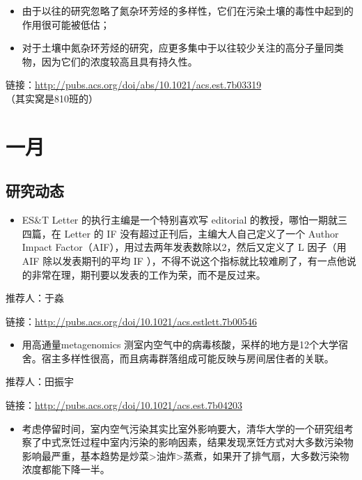 \documentclass[
]{book}
\providecommand{\tightlist}{%
  \setlength{\itemsep}{0pt}\setlength{\parskip}{0pt}}
\begin{document}
\begin{itemize}
\item
  由于以往的研究忽略了氮杂环芳烃的多样性，它们在污染土壤的毒性中起到的作用很可能被低估；
\item
  对于土壤中氮杂环芳烃的研究，应更多集中于以往较少关注的高分子量同类物，因为它们的浓度较高且具有持久性。
\end{itemize}

链接：\url{http://pubs.acs.org/doi/abs/10.1021/acs.est.7b03319}
（其实窝是810班的）

\hypertarget{ux4e00ux6708}{%
\section*{一月}\label{ux4e00ux6708}}

\hypertarget{ux7814ux7a76ux52a8ux6001-2}{%
\subsection*{研究动态}\label{ux7814ux7a76ux52a8ux6001-2}}

\begin{itemize}
\tightlist
\item
  ES\&T Letter 的执行主编是一个特别喜欢写 editorial 的教授，哪怕一期就三四篇，在 Letter 的 IF 没有超过正刊后，主编大人自己定义了一个 Author Impact Factor（AIF），用过去两年发表数除以2，然后又定义了 L 因子（用 AIF 除以发表期刊的平均 IF ），不得不说这个指标就比较难刷了，有一点他说的非常在理，期刊要以发表的工作为荣，而不是反过来。
\end{itemize}

推荐人：于淼

链接：\url{http://pubs.acs.org/doi/10.1021/acs.estlett.7b00546}

\begin{itemize}
\tightlist
\item
  用高通量metagenomics 测室内空气中的病毒核酸，采样的地方是12个大学宿舍。宿主多样性很高，而且病毒群落组成可能反映与房间居住者的关联。
\end{itemize}

推荐人：田振宇

链接：\url{http://pubs.acs.org/doi/10.1021/acs.est.7b04203}

\begin{itemize}
\tightlist
\item
  考虑停留时间，室内空气污染其实比室外影响要大，清华大学的一个研究组考察了中式烹饪过程中室内污染的影响因素，结果发现烹饪方式对大多数污染物影响最严重，基本趋势是炒菜\textgreater 油炸\textgreater 蒸煮，如果开了排气扇，大多数污染物浓度都能下降一半。
\end{itemize}
\end{document}
